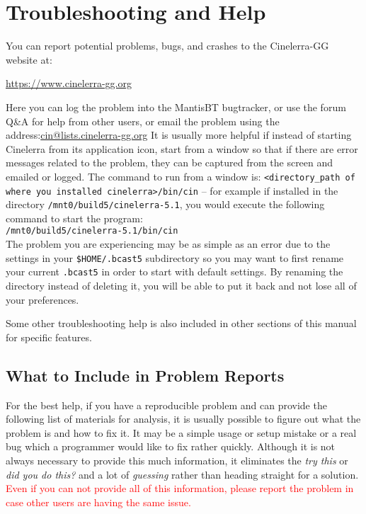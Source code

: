 \chapter{Troubleshooting and Help}%
\label{cha:troubleshooting_help}

You can report potential problems, bugs, and crashes to the Cinelerra-GG website at:

\begin{center}
	\href{https://www.cinelerra-gg.org/}{https://www.cinelerra-gg.org}
\end{center}

Here you can log the problem into the MantisBT bugtracker, or use the forum Q\&A for help from other users, or email the
problem using the address:{\small \href{mailto:cin@lists.cinelerra-gg.org}{cin@lists.cinelerra-gg.org}} It is usually more
helpful if instead of starting Cinelerra from its application icon, start from a window so that if there are error
messages related to the problem, they can be captured from the screen and emailed or logged. The command to run
from a window is: \texttt{<directory\_path of where you installed cinelerra>/bin/cin} -- for example if
installed in the directory \texttt{/mnt0/build5/cinelerra-5.1}, you would execute the following command to start the program:\\
\texttt{/mnt0/build5/cinelerra-5.1/bin/cin} \\
The problem you are experiencing may be as simple as an error due to the settings in your \texttt{\$HOME/.bcast5} subdirectory so you may want to first rename your current \texttt{.bcast5} in order to start with default settings. By renaming the directory instead of deleting it, you will be able to put it back and not lose all of your preferences.

Some other troubleshooting help is also included in other sections of this manual for specific features.

\section{What to Include in Problem Reports}%
\label{cha:include_in_problem_reports}
For the best help, if you have a reproducible problem and can provide the following list of materials for analysis, it
is usually possible to figure out what the problem is and how to fix it. It may be a simple usage or setup mistake or
a real bug which a programmer would like to fix rather quickly. Although it is not always necessary to provide this
much information, it eliminates the \textit{try this} or \textit{did you do this?} and a lot of \textit{guessing} rather than heading straight for a solution. \textcolor{red}{Even if you can not provide all of this information, please report the problem in case other users are having the same issue.}


